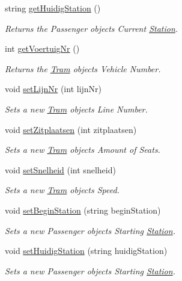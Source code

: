 \begin{DoxyCompactItemize}
string \hyperlink{classTram_a1e28b662a6ef3833faa2920247a139ee}{get\+Huidig\+Station} ()
\begin{DoxyCompactList}\small\item\em Returns the Passenger object\textquotesingle{}s Current \hyperlink{classStation}{Station}. \end{DoxyCompactList}\item 
int \hyperlink{classTram_abce34b0915945a2d7ede17297a727301}{get\+Voertuig\+Nr} ()
\begin{DoxyCompactList}\small\item\em Returns the \hyperlink{classTram}{Tram} object\textquotesingle{}s Vehicle Number. \end{DoxyCompactList}\item 
void \hyperlink{classTram_ac877b48ea6699c11ae580d8c71e140ac}{set\+Lijn\+Nr} (int lijn\+Nr)
\begin{DoxyCompactList}\small\item\em Sets a new \hyperlink{classTram}{Tram} object\textquotesingle{}s Line Number. \end{DoxyCompactList}\item 
void \hyperlink{classTram_a9071e3ddf218c290ae5d7ef3365097eb}{set\+Zitplaatsen} (int zitplaatsen)
\begin{DoxyCompactList}\small\item\em Sets a new \hyperlink{classTram}{Tram} object\textquotesingle{}s Amount of Seats. \end{DoxyCompactList}\item 
void \hyperlink{classTram_a2853d9b5d5d519e6757e6e3480d3b1c6}{set\+Snelheid} (int snelheid)
\begin{DoxyCompactList}\small\item\em Sets a new \hyperlink{classTram}{Tram} object\textquotesingle{}s Speed. \end{DoxyCompactList}\item 
void \hyperlink{classTram_a1f940f1fa5c8be660561f24750f25dd7}{set\+Begin\+Station} (string begin\+Station)
\begin{DoxyCompactList}\small\item\em Sets a new Passenger object\textquotesingle{}s Starting \hyperlink{classStation}{Station}. \end{DoxyCompactList}\item 
void \hyperlink{classTram_a3db658161102fcd0eccf7975982b1f1d}{set\+Huidig\+Station} (string huidig\+Station)
\begin{DoxyCompactList}\small\item\em Sets a new Passenger object\textquotesingle{}s Starting \hyperlink{classStation}{Station}. \end{DoxyCompactList}\item 

\end{DoxyCompactItemize}
